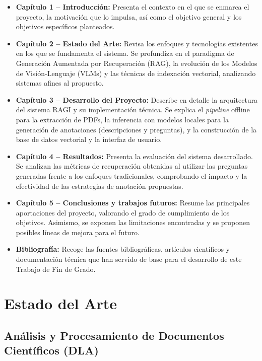 \documentclass[a4paper]{report}
\begin{document}
\begin{itemize}
    \item \textbf{Capítulo 1 -- Introducción:} Presenta el contexto en el que se enmarca el proyecto, la motivación que lo impulsa, así como el objetivo general y los objetivos específicos planteados.
    
    \item \textbf{Capítulo 2 -- Estado del Arte:} Revisa los enfoques y tecnologías existentes en los que se fundamenta el sistema. Se profundiza en el paradigma de Generación Aumentada por Recuperación (RAG), la evolución de los Modelos de Visión-Lenguaje (VLMs) y las técnicas de indexación vectorial, analizando sistemas afines al propuesto.

    \item \textbf{Capítulo 3 -- Desarrollo del Proyecto:} Describe en detalle la arquitectura del sistema RAGI y su implementación técnica. Se explica el \textit{pipeline} offline para la extracción de PDFs, la inferencia con modelos locales para la generación de anotaciones (descripciones y preguntas), y la construcción de la base de datos vectorial y la interfaz de usuario.
    
    \item \textbf{Capítulo 4 -- Resultados:} Presenta la evaluación del sistema desarrollado. Se analizan las métricas de recuperación obtenidas al utilizar las preguntas generadas frente a los enfoques tradicionales, comprobando el impacto y la efectividad de las estrategias de anotación propuestas.
    
    \item \textbf{Capítulo 5 -- Conclusiones y trabajos futuros:} Resume las principales aportaciones del proyecto, valorando el grado de cumplimiento de los objetivos. Asimismo, se exponen las limitaciones encontradas y se proponen posibles líneas de mejora para el futuro.
    
    \item \textbf{Bibliografía:} Recoge las fuentes bibliográficas, artículos científicos y documentación técnica que han servido de base para el desarrollo de este Trabajo de Fin de Grado.
\end{itemize}


\chapter{Estado del Arte}

\section{Análisis y Procesamiento de Documentos Científicos (DLA)}
\label{sec:estado_arte_dla}
\end{document}
